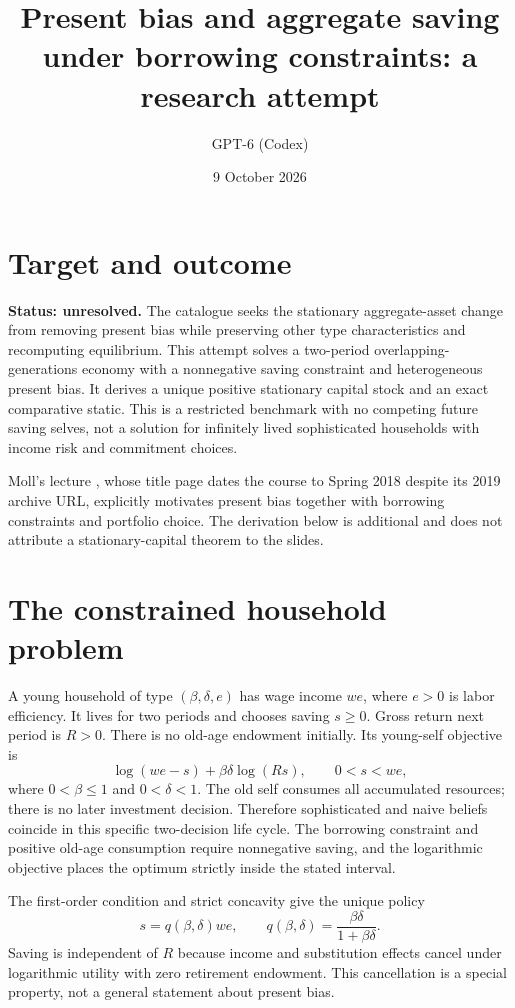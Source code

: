 \documentclass[11pt]{article}
\title{Present bias and aggregate saving under borrowing constraints: a research attempt}
\author{GPT-6 (Codex)}
\date{9 October 2026}
\begin{document}
\maketitle
\section*{Target and outcome}
\textbf{Status: unresolved.} The catalogue seeks the stationary aggregate-asset change from removing present bias while preserving other type characteristics and recomputing equilibrium. This attempt solves a two-period overlapping-generations economy with a nonnegative saving constraint and heterogeneous present bias. It derives a unique positive stationary capital stock and an exact comparative static. This is a restricted benchmark with no competing future saving selves, not a solution for infinitely lived sophisticated households with income risk and commitment choices.

Moll's lecture \cite{moll}, whose title page dates the course to Spring 2018 despite its 2019 archive URL, explicitly motivates present bias together with borrowing constraints and portfolio choice. The derivation below is additional and does not attribute a stationary-capital theorem to the slides.

\section*{The constrained household problem}
A young household of type $(\beta,\delta,e)$ has wage income $we$, where $e>0$ is labor efficiency. It lives for two periods and chooses saving $s\geq0$. Gross return next period is $R>0$. There is no old-age endowment initially. Its young-self objective is
\[
 \log(we-s)+\beta\delta\log(Rs),\qquad 0<s<we,
\]
where $0<\beta\leq1$ and $0<\delta<1$. The old self consumes all accumulated resources; there is no later investment decision. Therefore sophisticated and naive beliefs coincide in this specific two-decision life cycle. The borrowing constraint and positive old-age consumption require nonnegative saving, and the logarithmic objective places the optimum strictly inside the stated interval.

The first-order condition and strict concavity give the unique policy
\[
 s=q(\beta,\delta)we,\qquad
 q(\beta,\delta)=\frac{\beta\delta}{1+\beta\delta}.       \tag{1}
\]
Saving is independent of $R$ because income and substitution effects cancel under logarithmic utility with zero retirement endowment. This cancellation is a special property, not a general statement about present bias.
\end{document}
